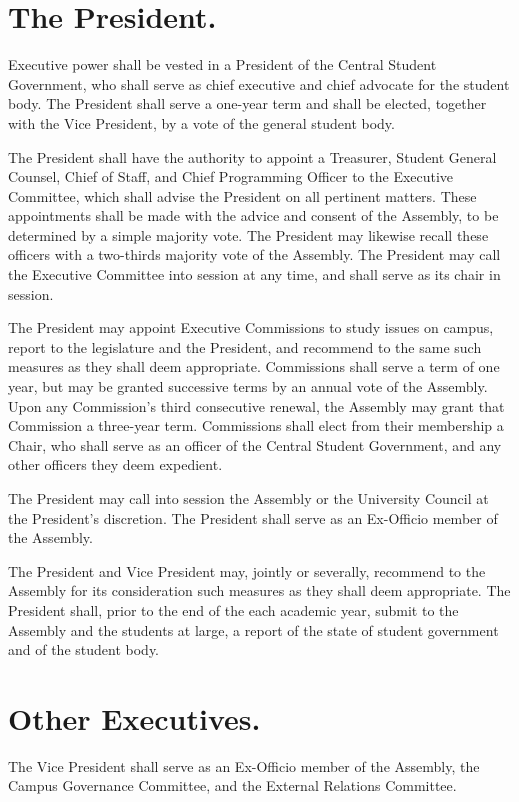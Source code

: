 \section{The President.}
    Executive power shall be vested in a President of the Central Student Government, who shall serve as chief executive and chief advocate for the student body. The President shall serve a one-year term and shall be elected, together with the Vice President, by a vote of the general student body.

    The President shall have the authority to appoint a Treasurer, Student General Counsel, Chief of Staff, and Chief Programming Officer to the Executive Committee, which shall advise the President on all pertinent matters. These appointments shall be made with the advice and consent of the Assembly, to be determined by a simple majority vote. The President may likewise recall these officers with a two-thirds majority vote of the Assembly. The President may call the Executive Committee into session at any time, and shall serve as its chair in session.

    The President may appoint Executive Commissions to study issues on campus, report to the legislature and the President, and recommend to the same such measures as they shall deem appropriate. Commissions shall serve a term of one year, but may be granted successive terms by an annual vote of the Assembly. Upon any Commission's third consecutive renewal, the Assembly may grant that Commission a three-year term. Commissions shall elect from their membership a Chair, who shall serve as an officer of the Central Student Government, and any other officers they deem expedient.

    The President may call into session the Assembly or the University Council at the President's discretion. The President shall serve as an Ex-Officio member of the Assembly.

    The President and Vice President may, jointly or severally, recommend to the Assembly for its consideration such measures as they shall deem appropriate. The President shall, prior to the end of the each academic year, submit to the Assembly and the students at large, a report of the state of student government and of the student body.

\section{Other Executives.}
    The Vice President shall serve as an Ex-Officio member of the Assembly, the Campus Governance Committee, and the External Relations Committee.

